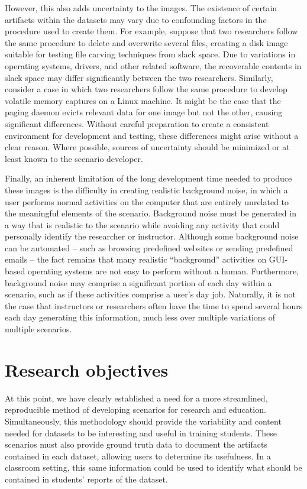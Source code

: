 \documentclass[letterpaper,12pt]{report}
\begin{document}
However, this also adds uncertainty to the images. The existence of
certain artifacts within the datasets may vary due to confounding
factors in the procedure used to create them. For example, suppose that
two researchers follow the same procedure to delete and overwrite
several files, creating a disk image suitable for testing file carving
techniques from slack space. Due to variations in operating systems,
drivers, and other related software, the recoverable contents in slack
space may differ significantly between the two researchers. Similarly,
consider a case in which two researchers follow the same procedure to
develop volatile memory captures on a Linux machine. It might be the
case that the paging daemon evicts relevant data for one image but not
the other, causing significant differences. Without careful preparation
to create a consistent environment for development and testing, these
differences might arise without a clear reason. Where possible, sources
of uncertainty should be minimized or at least known to the scenario
developer.

Finally, an inherent limitation of the long development time needed to
produce these images is the difficulty in creating realistic background
noise, in which a user performs normal activities on the computer that
are entirely unrelated to the meaningful elements of the scenario.
Background noise must be generated in a way that is realistic to the
scenario while avoiding any activity that could personally identify the
researcher or instructor. Although some background noise can be
automated -- such as browsing predefined websites or sending predefined
emails -- the fact remains that many realistic ``background'' activities
on GUI-based operating systems are not easy to perform without a human.
Furthermore, background noise may comprise a significant portion of each
day within a scenario, such as if these activities comprise a user's day
job. Naturally, it is not the case that instructors or researchers often
have the time to spend several hours each day generating this
information, much less over multiple variations of multiple scenarios.

\section{Research objectives}\label{research-objectives}

At this point, we have clearly established a need for a more
streamlined, reproducible method of developing scenarios for research
and education. Simultaneously, this methodology should provide the
variability and content needed for datasets to be interesting and useful
in training students. These scenarios must also provide ground truth
data to document the artifacts contained in each dataset, allowing users
to determine its usefulness. In a classroom setting, this same
information could be used to identify what should be contained in
students' reports of the dataset.
\end{document}
